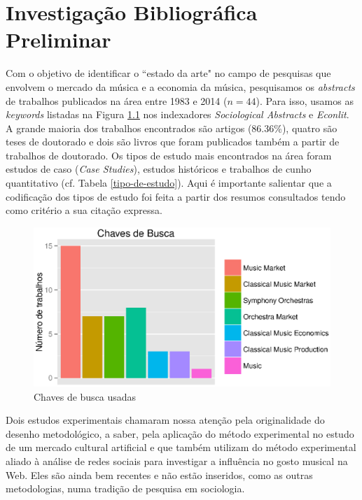\documentclass[a4paper, 12pt, openright, oneside, german, french, english, brazil]{abntex2}
\begin{document}
	
	
	
	
	
	
	

	\chapter{Investigação Bibliográfica Preliminar}

	Com o objetivo de identificar o ``estado da arte"  no campo de pesquisas que envolvem o mercado da música e a economia da música, pesquisamos os \textit{abstracts} de trabalhos publicados na área entre 1983 e 2014 ($n=44$). Para isso, usamos as \textit{keywords} listadas na Figura \ref{chaves-busca} nos indexadores \textit{Sociological Abstracts} e \textit{Econlit}. A grande maioria dos trabalhos encontrados são artigos (86.36\%), quatro são teses de doutorado e dois são livros que foram publicados também a partir de trabalhos de doutorado. Os tipos de estudo mais encontrados na área foram estudos de caso (\textit{Case Studies}), estudos históricos e trabalhos de cunho quantitativo (cf. Tabela \ref{tipo-de-estudo}). Aqui é importante salientar que a codificação dos tipos de estudo foi feita a partir dos resumos consultados tendo como critério a sua citação expressa.

	\begin{figure}[!h]
		\centering
		\caption{Chaves de busca usadas}
		\label{chaves-busca}
		\includegraphics[scale=0.8]{chave.eps}
	\end{figure}



	Dois estudos experimentais chamaram nossa atenção pela originalidade do desenho metodológico, a saber,  pela aplicação do método experimental no estudo de um mercado cultural artificial e  que também utilizam do método experimental aliado à análise de redes sociais para investigar a influência no gosto musical na Web.  Eles são ainda bem recentes e não estão inseridos, como as outras metodologias, numa tradição de pesquisa em sociologia.
\end{document}
